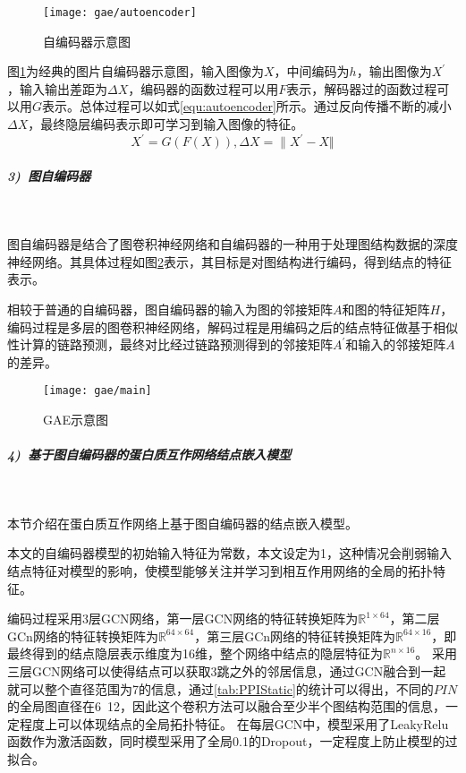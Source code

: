 \begin{figure}[htbp]
    \centering
    \texttt{[image: gae/autoencoder]}
    \caption{自编码器示意图}
    \label{fig:gae/autoencoder}
\end{figure}

图\ref{fig:gae/autoencoder}为经典的图片自编码器示意图，输入图像为$X$，中间编码为$h$，输出图像为$X^\prime $，输入输出差距为$\varDelta X$，编码器的函数过程可以用$F$表示，解码器过的函数过程可以用$G$表示。总体过程可以如式\ref{equ:autoencoder}所示。通过反向传播不断的减小$\varDelta X$，最终隐层编码表示即可学习到输入图像的特征。
\begin{equation}
    \label{equ:autoencoder}
    X^\prime =G(F(X)),
    \varDelta X={\| X^\prime - X \Vert}
\end{equation}

\subparagraph{3)~图自编码器} ~

图自编码器是结合了图卷积神经网络和自编码器的一种用于处理图结构数据的深度神经网络。其具体过程如图\ref{fig:gae/main}表示，其目标是对图结构进行编码，得到结点的特征表示。

相较于普通的自编码器，图自编码器的输入为图的邻接矩阵$A$和图的特征矩阵$H$，编码过程是多层的图卷积神经网络，解码过程是用编码之后的结点特征做基于相似性计算的链路预测，最终对比经过链路预测得到的邻接矩阵$A^{\prime}$和输入的邻接矩阵$A$的差异。

\begin{figure}[htbp]
    \centering
    \texttt{[image: gae/main]}
    \caption{GAE示意图\cite{wu_comprehensive_2020}}
    \label{fig:gae/main}
\end{figure}


\subparagraph{4)~基于图自编码器的蛋白质互作网络结点嵌入模型} ~

本节介绍在蛋白质互作网络上基于图自编码器的结点嵌入模型。

本文的自编码器模型的初始输入特征为常数，本文设定为1，这种情况会削弱输入结点特征对模型的影响，使模型能够关注并学习到相互作用网络的全局的拓扑特征。

编码过程采用3层GCN网络，第一层GCN网络的特征转换矩阵为$\mathbb{R} ^{1\times 64}$，第二层GCn网络的特征转换矩阵为$\mathbb{R} ^{64\times 64}$，第三层GCn网络的特征转换矩阵为$\mathbb{R} ^{64\times 16}$，即最终得到的结点隐层表示维度为16维，整个网络中结点的隐层特征为$\mathbb{R} ^{n\times 16}$。
采用三层GCN网络可以使得结点可以获取3跳之外的邻居信息，通过GCN融合到一起就可以整个直径范围为7的信息，通过\ref{tab:PPIStatic}的统计可以得出，不同的$PIN$的全局图直径在6~12，因此这个卷积方法可以融合至少半个图结构范围的信息，一定程度上可以体现结点的全局拓扑特征。
在每层GCN中，模型采用了LeakyRelu函数作为激活函数，同时模型采用了全局0.1的Dropout，一定程度上防止模型的过拟合。

